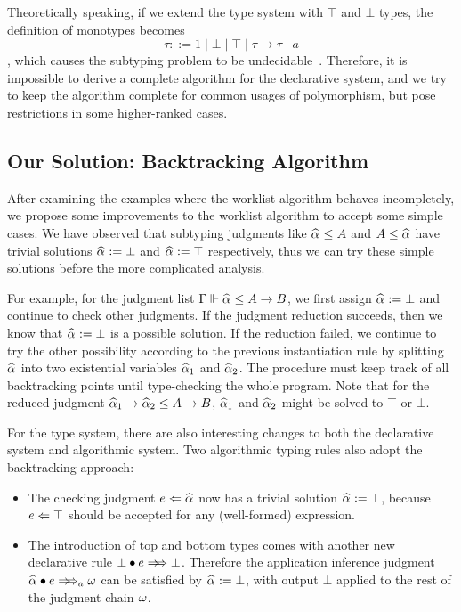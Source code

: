 Theoretically speaking, if we extend the type system with $\top$ and $\bot$ types,
the definition of monotypes becomes
\[ \tau ::= 1 \mid \bot \mid \top \mid \tau \to \tau \mid a\]
, which causes the subtyping problem to be undecidable~\cite{su2002firstorder}.
Therefore, it is impossible to derive a complete algorithm for the declarative system,
and we try to keep the algorithm complete for common usages of polymorphism,
but pose restrictions in some higher-ranked cases.



\subsection{Our Solution: Backtracking Algorithm}

After examining the examples where the worklist algorithm behaves incompletely,
we propose some improvements to the worklist algorithm to accept some simple cases.
We have observed that subtyping judgments like $\al \le A$ and $A \le \al$ have trivial solutions
$\al := \bot$ and $\al := \top$ respectively,
thus we can try these simple solutions before the more complicated analysis.

For example, for the judgment list $\Gm \Vdash \al \le A \to B$,
we first assign $\al := \bot$ and continue to check other judgments.
If the judgment reduction succeeds, then we know that $\al := \bot$ is a possible solution.
If the reduction failed, we continue to try the other possibility according to the
previous instantiation rule by splitting $\al$ into two existential variables $\al[1]$ and $\al[2]$.
The procedure must keep track of all backtracking points until type-checking the whole program.
Note that for the reduced judgment $\al[1] \to \al[2] \le A \to B$,
$\al[1]$ and $\al[2]$ might be solved to $\top$ or $\bot$.

For the type system, there are also interesting changes to
both the declarative system and algorithmic system.
Two algorithmic typing rules also adopt the backtracking approach:
\begin{itemize}
    \item The checking judgment $e \Lto \al$ now has a trivial solution $\al := \top$,
        because $e \Leftarrow \top$ should be accepted for any (well-formed) expression.
    \item The introduction of top and bottom types comes with another new declarative rule
        $\appInf{\bot}{e}{\bot}$.
        Therefore the application inference judgment $\appInfAlg{\al}{e}$
        can be satisfied by $\al := \bot$,
        with output $\bot$ applied to the rest of the judgment chain $\omega$.
\end{itemize}

